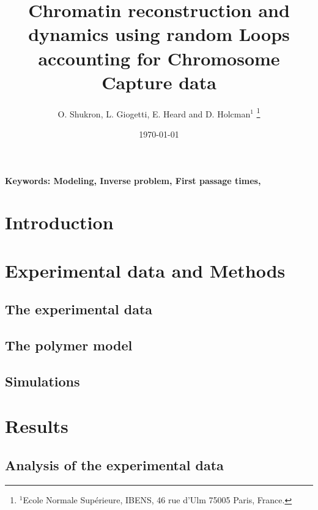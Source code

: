 \documentclass[12pt]{article}
\begin{document}
\title{Chromatin reconstruction and dynamics using random Loops accounting for Chromosome Capture data}
\author{O. Shukron,  L. Giogetti, E. Heard and D. Holcman$^{1}$ \footnote{ $^1$Ecole Normale Sup\'erieure, IBENS, 46 rue d'Ulm 75005 Paris, France.}}
\date{\today}
\maketitle
\begin{abstract}\label{abstract}
\end{abstract}
{\bf \noindent Keywords: Modeling, Inverse problem, First passage times,}\\

\section{Introduction}\label{section_introduction}

\section{Experimental data and Methods}\label{section_experimentalDataAndMethods}

\subsection{The experimental data}\label{subsection_theExperimentalData}

\subsection{The polymer model}\label{subsection_thePolymerModel}

\subsection{Simulations}\label{subsection_simulations}

\section{Results}\label{section_results}

\subsection{Analysis of the experimental data}\label{subsection_analysisOfTheExperimentalData}
\end{document}
